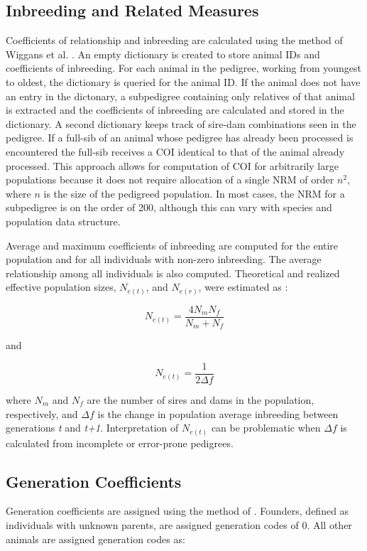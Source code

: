 \subsection{Inbreeding and Related Measures}
\label{sec:methodology-computation-inbreeding}
Coefficients of relationship and inbreeding are calculated using the method of Wiggans et al. \citeyear{ref337}.  An empty dictionary is created to store animal IDs and coefficients of inbreeding.  For each animal in the pedigree, working from youngest to oldest, the dictionary is queried for the animal ID.  If the animal does not have an entry in the dictonary, a subpedigree containing only relatives of that animal is extracted and the coefficients of inbreeding are calculated and stored in the dictionary.  A second dictionary keeps track of sire-dam combinations seen in the pedigree.  If a full-sib of an animal whose pedigree has already been processed is encountered the full-sib receives a COI identical to that of the animal already processed.  This approach allows for computation of COI for arbitrarily large populations because it does not require allocation of a single NRM of order $n^{2}$, where $n$ is the size of the pedigreed population.  In most cases, the NRM for a subpedigree is on the order of 200, although this can vary with species and population data structure.

Average and maximum coefficients of inbreeding are computed for the entire population and for all individuals with non-zero inbreeding.  The average relationship among all individuals is also computed.  Theoretical and realized effective population
sizes, $N_{e(t)}$, and $N_{e(r)}$, were estimated as \cite{ref91}:

\[ N_{e(t)} = \dfrac{ 4 N_m N_f } { N_m + N_f } \]

and

\[ N_{e(t)} = \dfrac{1}{2 \Delta f} \]

where $N_m$ and $N_f$ are the number of sires and dams in the population, respectively, and $\Delta f$ is the change in
population average inbreeding between generations \textit{t} and \textit{t+1}.  Interpretation of $N_{e(t)}$ can be
problematic when $\Delta f$ is calculated from incomplete or error-prone pedigrees.
\subsection{Generation Coefficients}
\label{sec:methodology-computation-generation-coefficients}
Generation coefficients are assigned using the method of \cite{Pattie1965}.  Founders, defined as individuals with unknown parents, are assigned generation codes of 0. All other animals are assigned generation codes as:

